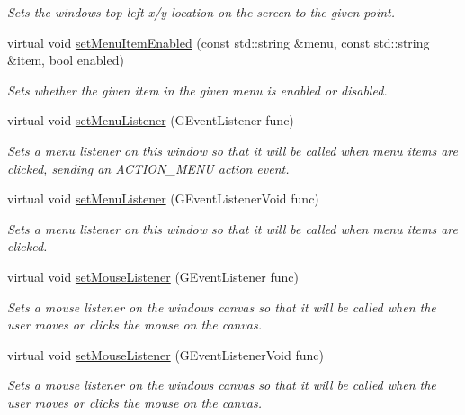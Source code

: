 \begin{DoxyCompactItemize}
\begin{DoxyCompactList}\small\item\em Sets the window\textquotesingle{}s top-\/left x/y location on the screen to the given point. \end{DoxyCompactList}\item 
virtual void \mbox{\hyperlink{classGWindow_a875124740630bebec069479fd3958efc}{set\+Menu\+Item\+Enabled}} (const std\+::string \&menu, const std\+::string \&item, bool enabled)
\begin{DoxyCompactList}\small\item\em Sets whether the given item in the given menu is enabled or disabled. \end{DoxyCompactList}\item 
virtual void \mbox{\hyperlink{classGWindow_ab0002e0bf6566a5b98cc9128cb859b0e}{set\+Menu\+Listener}} (G\+Event\+Listener func)
\begin{DoxyCompactList}\small\item\em Sets a menu listener on this window so that it will be called when menu items are clicked, sending an A\+C\+T\+I\+O\+N\+\_\+\+M\+E\+NU action event. \end{DoxyCompactList}\item 
virtual void \mbox{\hyperlink{classGWindow_a1294d48e67c30207da71c3e3ab56abde}{set\+Menu\+Listener}} (G\+Event\+Listener\+Void func)
\begin{DoxyCompactList}\small\item\em Sets a menu listener on this window so that it will be called when menu items are clicked. \end{DoxyCompactList}\item 
virtual void \mbox{\hyperlink{classGWindow_a37d8dbc943f59920f705b0104f60bde2}{set\+Mouse\+Listener}} (G\+Event\+Listener func)
\begin{DoxyCompactList}\small\item\em Sets a mouse listener on the window\textquotesingle{}s canvas so that it will be called when the user moves or clicks the mouse on the canvas. \end{DoxyCompactList}\item 
virtual void \mbox{\hyperlink{classGWindow_aea7f647ea62d59f71b5fad6aa65eeaf9}{set\+Mouse\+Listener}} (G\+Event\+Listener\+Void func)
\begin{DoxyCompactList}\small\item\em Sets a mouse listener on the window\textquotesingle{}s canvas so that it will be called when the user moves or clicks the mouse on the canvas. \end{DoxyCompactList}\item 

\end{DoxyCompactItemize}
